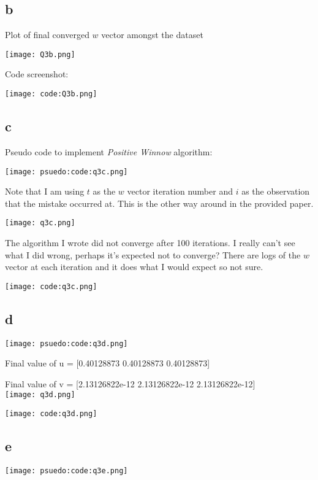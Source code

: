 \documentclass{article}
\begin{document}
\subsection*{b}

Plot of final converged \(w\) vector amongst the dataset

\texttt{[image: Q3b.png]}

Code screenshot: 

\texttt{[image: code:Q3b.png]}

\newpage
\subsection*{c}

Pseudo code to implement \emph{Positive Winnow} algorithm:

\texttt{[image: psuedo:code:q3c.png]}

Note that I am using \(t\) as the \(w\) vector iteration number and \(i\) as the observation that the mistake
occurred at. This is the other way around in the provided paper.

\texttt{[image: q3c.png]}

The algorithm I wrote did not converge after 100 iterations. I really can't see what I did wrong, perhaps it's expected not to converge?
There are logs of the \(w\) vector at each iteration and it does what I would expect so not sure.

\texttt{[image: code:q3c.png]}

\newpage
\subsection*{d}

\texttt{[image: psuedo:code:q3d.png]}

Final value of u = [0.40128873 0.40128873 0.40128873]

Final value of v = [2.13126822e-12 2.13126822e-12 2.13126822e-12]\\

\texttt{[image: q3d.png]}

\texttt{[image: code:q3d.png]}

\newpage
\subsection*{e}

\texttt{[image: psuedo:code:q3e.png]}
\end{document}
